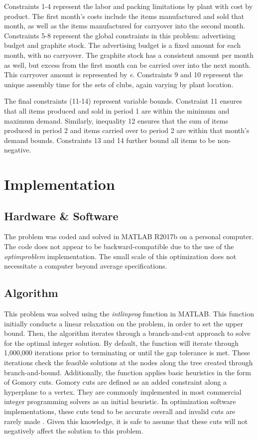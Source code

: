 \documentclass{article}
\begin{document}
Constraints 1-4 represent the labor and packing limitations by plant with cost by product.  The first month's costs include the items manufactured and sold that month, as well as the items manufactured 
for carryover into the second month.  Constraints 5-8 represent the global constraints in this problem:  advertising budget and graphite stock.  The advertising budget is a fixed amount for each month, with no carryover. The 
graphite stock has a consistent amount per month as well, but excess from the first month can be carried over into the next month.  This carryover amount is represented by \textit{e}.  Constraints 9 and 10 represent the unique assembly time 
for the sets of clubs, again varying by plant location. 
\par
The final constraints (11-14) represent variable bounds.  Constraint 11 ensures that all items produced and sold in period 1 are within the minimum and maximum demand.  Similarly, inequality 12 ensures that the sum of items produced in period 2 and items carried over to 
period 2 are within that month's demand bounds.  Constraints 13 and 14 further bound all items to be non-negative.


\section{Implementation}
\subsection{Hardware \& Software}
The problem was coded and solved in MATLAB R2017b on a personal computer.  The code does not appear to be backward-compatible due to the use of the \textit{optimproblem} implementation.  The small scale of this optimization does not necessitate a computer beyond average specifications.
\subsection{Algorithm}
This problem was solved using the \textit{intlinprog} function in MATLAB.  This function initially conducts a linear relaxation on the problem, in order to set the upper bound.  Then, the algorithm iterates through a branch-and-cut approach to solve for the optimal integer solution.  By default, the function 
will iterate through 1,000,000 iterations prior to terminating or until the gap tolerance is met.  These iterations check the feasible solutions at the nodes along the tree created through branch-and-bound.  Additionally, the function applies basic heuristics in the form of Gomory cuts.  Gomory cuts are defined as an added constraint along a hyperplane to a vertex.  They are commonly implemented in most commercial integer programming solvers as an initial heuristic.  In optimization software implementations, these cuts tend to be accurate overall and invalid cuts are rarely made \cite{gomory}.  Given this knowledge, it is safe to assume that these cuts will not negatively affect the solution to this problem.
\end{document}
